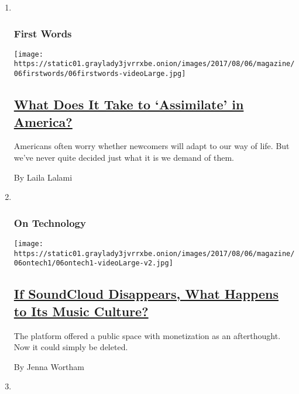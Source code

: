 \begin{enumerate}
\def\labelenumi{\arabic{enumi}.}
\item ~
  \hypertarget{first-words}{%
  \subsubsection{First Words}\label{first-words}}

  \texttt{[image: https://static01.graylady3jvrrxbe.onion/images/2017/08/06/magazine/06firstwords/06firstwords-videoLarge.jpg]}

  \hypertarget{what-does-it-take-to-assimilate-in-america}{%
  \subsection{\texorpdfstring{\href{/2017/08/01/magazine/what-does-it-take-to-assimilate-in-america.html}{What
  Does It Take to `Assimilate' in
  America?}}{What Does It Take to `Assimilate' in America?}}\label{what-does-it-take-to-assimilate-in-america}}

  Americans often worry whether newcomers will adapt to our way of life.
  But we've never quite decided just what it is we demand of them.

  By Laila Lalami
\item ~
  \hypertarget{on-technology}{%
  \subsubsection{On Technology}\label{on-technology}}

  \texttt{[image: https://static01.graylady3jvrrxbe.onion/images/2017/08/06/magazine/06ontech1/06ontech1-videoLarge-v2.jpg]}

  \hypertarget{if-soundcloud-disappears-what-happens-to-its-music-culture}{%
  \subsection{\texorpdfstring{\href{/2017/08/01/magazine/if-soundcloud-disappears-what-happens-to-its-music-culture.html}{If
  SoundCloud Disappears, What Happens to Its Music
  Culture?}}{If SoundCloud Disappears, What Happens to Its Music Culture?}}\label{if-soundcloud-disappears-what-happens-to-its-music-culture}}

  The platform offered a public space with monetization as an
  afterthought. Now it could simply be deleted.

  By Jenna Wortham
\item ~
  \hypertarget{diagnosis}{%
}
\end{enumerate}
